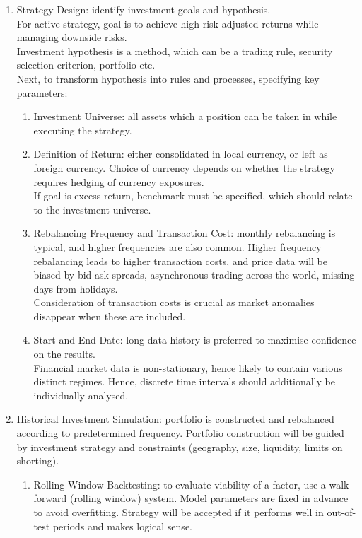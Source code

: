 \begin{method} 
\begin{enumerate}[label=\roman*.]
\setlength{\itemsep}{0pt}
\item Strategy Design: identify investment goals and hypothesis.\\
For active strategy, goal is to achieve high risk-adjusted returns while managing downside risks.\\
Investment hypothesis is a method, which can be a trading rule, security selection criterion, portfolio etc.\\
Next, to transform hypothesis into rules and processes, specifying key parameters:
\begin{enumerate}[label=\arabic*.]
\setlength{\itemsep}{0pt}
\item Investment Universe: all assets which a position can be taken in while executing the strategy.
\item Definition of Return: either consolidated in local currency, or left as foreign currency. Choice of currency depends on whether the strategy requires hedging of currency exposures.\\
If goal is excess return, benchmark must be specified, which should relate to the investment universe.
\item Rebalancing Frequency and Transaction Cost: monthly rebalancing is typical, and higher frequencies are also common. Higher frequency rebalancing leads to higher transaction costs, and price data will be biased by bid-ask spreads, asynchronous trading across the world, missing days from holidays.\\
Consideration of transaction costs is crucial as market anomalies disappear when these are included.
\item Start and End Date: long data history is preferred to maximise confidence on the results.\\
Financial market data is non-stationary, hence likely to contain various distinct regimes. Hence, discrete time intervals should additionally be individually analysed.
\end{enumerate}
\item Historical Investment Simulation: portfolio is constructed and rebalanced according to predetermined frequency. Portfolio construction will be guided by investment strategy and constraints (geography, size, liquidity, limits on shorting).
\begin{enumerate}[label=\arabic*.]
\setlength{\itemsep}{0pt}
\item Rolling Window Backtesting: to evaluate viability of a factor, use a walk-forward (rolling window) system. Model parameters are fixed in advance to avoid overfitting. Strategy will be accepted if it performs well in out-of-test periods and makes logical sense.\\

\end{enumerate}
\end{enumerate}
\end{method}
